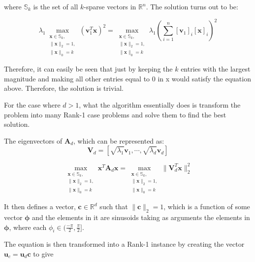 \documentclass[11pt,a4paper]{article}
\begin{document}
where $\mathbb{S}_k$ is the set of all $k$-sparse vectors in $\mathbb{R}^n$. The solution turns out to be:

\begin{equation*}
\lambda_1\max_{\substack{\mathbf{x} \in\mathbb{S}_k, \\ \|\mathbf{x}\|_2 = 1, \\ \|\mathbf{x}\|_0 = k}} \left(\mathbf{v}_1^T \mathbf{x}\right)^2 = \max_{\substack{\mathbf{x} \in\mathbb{S}_k, \\ \|\mathbf{x}\|_2 = 1, \\ \|\mathbf{x}\|_0 = k}} \lambda_1\left( \sum_{i = 1}^n [\mathbf{v}_{1}]_i [\mathbf{x}]_i\right)^2
\end{equation*}

Therefore, it can easily be seen that just by keeping the $k$ entries with the largest magnitude and making all other entries equal to 0 in x would satisfy the equation above. Therefore, the solution is trivial. 

For the case where $d > 1$, what the algorithm essentially does is transform the problem into many Rank-1 case problems and solve them to find the best solution.

The eigenvectors of $\mathbf{A}_d$, which can be represented as:
\begin{equation*}
\mathbf{V}_d = [\sqrt{\lambda_1}\mathbf{v}_1, \cdots, \sqrt{\lambda_d}\mathbf{v}_d]
\end{equation*}

\begin{equation*}
\max_{\substack{\mathbf{x} \in\mathbb{S}_k, \\ \|\mathbf{x}\|_2 = 1, \\ \|\mathbf{x}\|_0 = k}}  \mathbf{x}^T\mathbf{A}_d\mathbf{x} = \max_{\substack{\mathbf{x} \in\mathbb{S}_k, \\ \|\mathbf{x}\|_2 = 1, \\ \|\mathbf{x}\|_0 = k}} \|\mathbf{V}_d^T\mathbf{x}\|_2^2
\end{equation*}


It then defines a vector, $\mathbf{c} \in \mathbb{R}^d$ such that $\|\mathbf{c}\|_2=1$, which is a function of some vector $\mathbf{\phi}$ and the elements in it are sinusoids taking as arguments the elements in $\mathbf{\phi}$, where each $\phi_i \in (\frac{-\pi}{2}, \frac{\pi}{2}]$.

The equation is then transformed into a Rank-1 instance by creating the vector $\mathbf{u}_c = \mathbf{u}_d \mathbf{c}$ to give 
\end{document}
